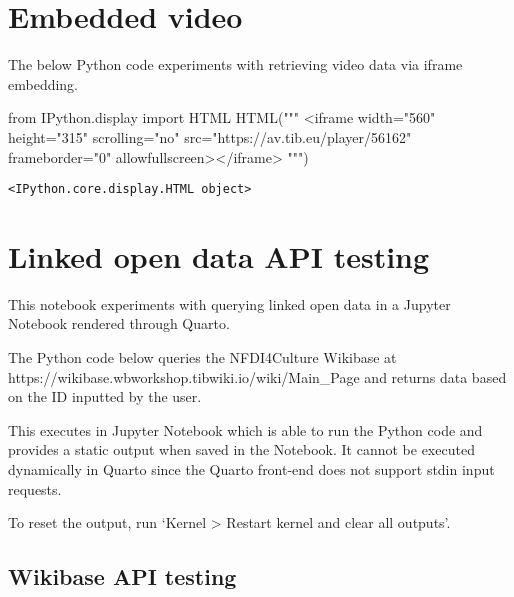 \documentclass[
  letterpaper,
  DIV=11,
  numbers=noendperiod]{scrreprt}
\newenvironment{Shaded}{\begin{snugshade}}{\end{snugshade}}
\newcommand{\ImportTok}[1]{\textcolor[rgb]{0.00,0.46,0.62}{#1}}
\newcommand{\NormalTok}[1]{\textcolor[rgb]{0.00,0.23,0.31}{#1}}
\newcommand{\StringTok}[1]{\textcolor[rgb]{0.13,0.47,0.30}{#1}}
\begin{document}

\hypertarget{embedded-video}{%
\chapter{Embedded video}\label{embedded-video}}

The below Python code experiments with retrieving video data via iframe
embedding.

\begin{Shaded}
\begin{Highlighting}[]
\ImportTok{from}\NormalTok{ IPython.display }\ImportTok{import}\NormalTok{ HTML}
\NormalTok{HTML(}\StringTok{"""}
\StringTok{\textless{}iframe width="560" height="315" scrolling="no" src="https://av.tib.eu/player/56162" frameborder="0" allowfullscreen\textgreater{}\textless{}/iframe\textgreater{}}
\StringTok{"""}\NormalTok{)}
\end{Highlighting}
\end{Shaded}

\begin{verbatim}
<IPython.core.display.HTML object>
\end{verbatim}


\hypertarget{linked-open-data-api-testing}{%
\chapter{Linked open data API
testing}\label{linked-open-data-api-testing}}

This notebook experiments with querying linked open data in a Jupyter
Notebook rendered through Quarto.

The Python code below queries the NFDI4Culture Wikibase at
https://wikibase.wbworkshop.tibwiki.io/wiki/Main\_Page and returns data
based on the ID inputted by the user.

This executes in Jupyter Notebook which is able to run the Python code
and provides a static output when saved in the Notebook. It cannot be
executed dynamically in Quarto since the Quarto front-end does not
support stdin input requests.

To reset the output, run `Kernel \textgreater{} Restart kernel and clear
all outputs'.

\hypertarget{wikibase-api-testing}{%
\section{Wikibase API testing}\label{wikibase-api-testing}}
\end{document}
